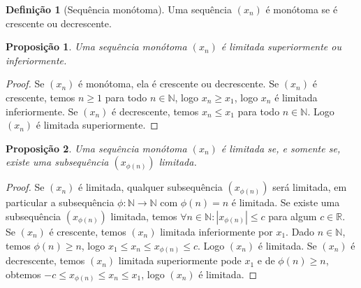 \documentclass{article}
\theoremstyle{plain}
\newtheorem{prop}{Proposição}[section]
\theoremstyle{definition}
\newtheorem{definicao}{Definição}[section]
\theoremstyle{remark}
\begin{document}
\begin{definicao}[Sequência monótoma]
	Uma sequência $(x_n)$ é monótoma se é crescente ou decrescente. 
\end{definicao}
\begin{prop}
	Uma sequência monótoma $(x_n)$ é limitada superiormente ou inferiormente.
\end{prop}
\begin{proof}
	Se $(x_n)$ é monótoma, ela é crescente ou decrescente. Se $(x_n)$ é crescente, temos $ n \geq 1 $ para todo $n \in \mathbb{N}$, logo $x_n \geq x_1$, logo $x_n$ é limitada inferiormente. Se $(x_n)$ é decrescente, temos $x_n \leq x_1$ para todo $n\in \mathbb{N}$. Logo $(x_n)$ é limitada superiormente.
\end{proof}
\begin{prop}
	Uma sequência monótoma $(x_n)$ é limitada se, e somente se, existe uma subsequência $(x_{\phi(n)})$  limitada.
\end{prop}
\begin{proof}
	Se $(x_n)$ é limitada, qualquer subsequência $(x_{\phi(n)})$ será limitada, em particular a subsequência $\phi:\mathbb{N} \to \mathbb{N}$ com  $\phi(n) = n$ é limitada.
	Se existe uma subsequência $(x_{\phi(n)})$ limitada,  temos $\forall n \in \mathbb{N} : |x_{\phi(n)}| \leq c$ para algum $c\in \mathbb{R}$. Se $(x_n)$ é crescente, temos $(x_n)$ limitada inferiormente por $x_1$. Dado $n \in \mathbb{N}$, temos $\phi(n) \geq n$, logo $ x_1 \leq x_{n} \leq x_{\phi(n)} \leq c$. Logo $(x_n)$ é limitada.  Se $(x_n)$ é decrescente, temos $(x_n)$ limitada superiormente pode $x_1$ e de $\phi(n) \geq n$, obtemos $-c \leq x_{\phi(n)} \leq x_n \leq x_1 $, logo $(x_n)$ é limitada.
\end{proof}
\end{document}
